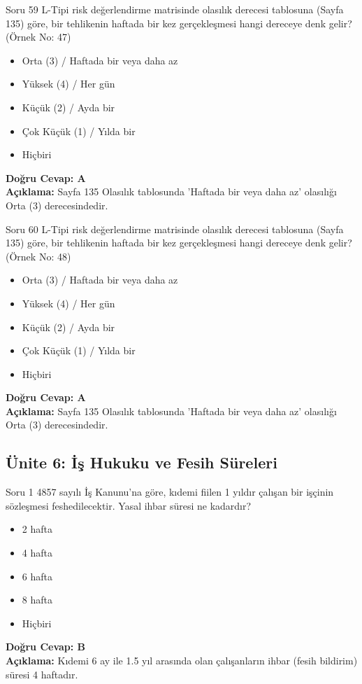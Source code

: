 \documentclass[12pt,a4paper]{article}
\begin{document}
\begin{testcard}{Soru 59}
    L-Tipi risk değerlendirme matrisinde olasılık derecesi tablosuna (Sayfa 135) göre, bir tehlikenin haftada bir kez gerçekleşmesi hangi dereceye denk gelir? (Örnek No: 47)
    \begin{itemize}
        \item[A)] Orta (3) / Haftada bir veya daha az
        \item[B)] Yüksek (4) / Her gün
        \item[C)] Küçük (2) / Ayda bir
        \item[D)] Çok Küçük (1) / Yılda bir
        \item[E)] Hiçbiri
    \end{itemize}
    \tcblower
    \textbf{Doğru Cevap: A} \\
    \textbf{Açıklama:} Sayfa 135 Olasılık tablosunda 'Haftada bir veya daha az' olasılığı Orta (3) derecesindedir.
\end{testcard}

\begin{testcard}{Soru 60}
    L-Tipi risk değerlendirme matrisinde olasılık derecesi tablosuna (Sayfa 135) göre, bir tehlikenin haftada bir kez gerçekleşmesi hangi dereceye denk gelir? (Örnek No: 48)
    \begin{itemize}
        \item[A)] Orta (3) / Haftada bir veya daha az
        \item[B)] Yüksek (4) / Her gün
        \item[C)] Küçük (2) / Ayda bir
        \item[D)] Çok Küçük (1) / Yılda bir
        \item[E)] Hiçbiri
    \end{itemize}
    \tcblower
    \textbf{Doğru Cevap: A} \\
    \textbf{Açıklama:} Sayfa 135 Olasılık tablosunda 'Haftada bir veya daha az' olasılığı Orta (3) derecesindedir.
\end{testcard}

\subsection{Ünite 6: İş Hukuku ve Fesih Süreleri}
\begin{testcard}{Soru 1}
    4857 sayılı İş Kanunu'na göre, kıdemi fiilen 1 yıldır çalışan bir işçinin sözleşmesi feshedilecektir. Yasal ihbar süresi ne kadardır?
    \begin{itemize}
        \item[A)] 2 hafta
        \item[B)] 4 hafta
        \item[C)] 6 hafta
        \item[D)] 8 hafta
        \item[E)] Hiçbiri
    \end{itemize}
    \tcblower
    \textbf{Doğru Cevap: B} \\
    \textbf{Açıklama:} Kıdemi 6 ay ile 1.5 yıl arasında olan çalışanların ihbar (fesih bildirim) süresi 4 haftadır.
\end{testcard}
\end{document}
